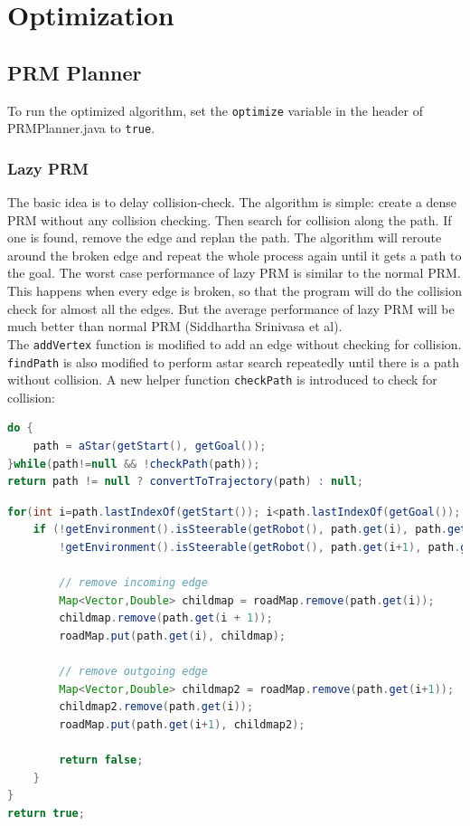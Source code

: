\documentclass[9.5pt]{extarticle}
\begin{document}
\section{Optimization}
\subsection{PRM Planner}

To run the optimized algorithm, set the \verb`optimize` variable in the header of PRMPlanner.java to \verb`true`.

\subsubsection{Lazy PRM}

The basic idea is to delay collision-check. The algorithm is simple: create a dense PRM without any collision checking. Then search for collision along the path. If one is found, remove the edge and replan the path. The algorithm will reroute around the broken edge and repeat the whole process again until it gets a path to the goal. The worst case performance of lazy PRM is similar to the normal PRM. This happens when every edge is broken, so that the program will do the collision check for almost all the edges. But the average performance of lazy PRM will be much better than normal PRM (Siddhartha Srinivasa et al).\\

The \verb`addVertex` function is modified to add an edge without checking for collision. \verb`findPath` is also modified to perform astar search repeatedly until there is a path without collision. A new helper function \verb`checkPath` is introduced to check for collision:\\

\begin{lstlisting}[language=java,caption={Modified Java code for findPath}]
do {
	path = aStar(getStart(), getGoal());
}while(path!=null && !checkPath(path));
return path != null ? convertToTrajectory(path) : null;
\end{lstlisting}

\begin{lstlisting}[language=java,caption={Java code for checkPath}]
for(int i=path.lastIndexOf(getStart()); i<path.lastIndexOf(getGoal()); i++){
	if (!getEnvironment().isSteerable(getRobot(), path.get(i), path.get(i+1), RESOLUTION) ||
		!getEnvironment().isSteerable(getRobot(), path.get(i+1), path.get(i), RESOLUTION)){
		
		// remove incoming edge
		Map<Vector,Double> childmap = roadMap.remove(path.get(i));
		childmap.remove(path.get(i + 1));
		roadMap.put(path.get(i), childmap);
		
		// remove outgoing edge
		Map<Vector,Double> childmap2 = roadMap.remove(path.get(i+1));
		childmap2.remove(path.get(i));
		roadMap.put(path.get(i+1), childmap2);

		return false;
	}
}
return true;
\end{lstlisting}
\end{document}
